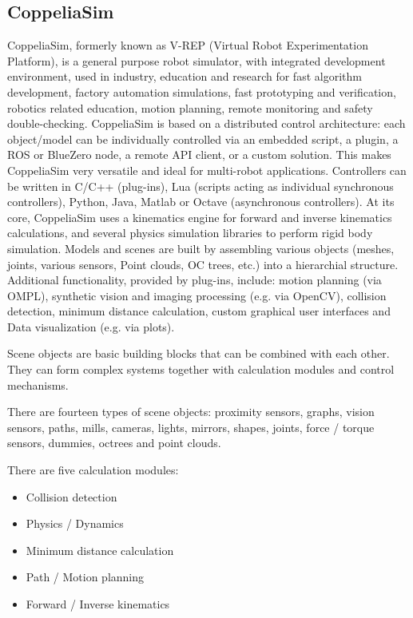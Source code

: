 \subsection{CoppeliaSim}
CoppeliaSim, formerly known as V-REP (Virtual Robot Experimentation Platform), is a general purpose robot simulator, with integrated development environment, used in industry, education and research for fast algorithm development, factory automation simulations, fast prototyping and verification, robotics related education, motion planning, remote monitoring and safety double-checking. 
CoppeliaSim is based on a distributed control architecture: each object/model can be individually controlled via an embedded script, a plugin, a ROS or BlueZero node, a remote API client, or a custom solution. This makes CoppeliaSim very versatile and ideal for multi-robot applications. Controllers can be written in C/C++ (plug-ins), Lua (scripts acting as individual synchronous controllers), Python, Java,  Matlab or Octave (asynchronous controllers). \cite{Robotsim90:online}
At its core, CoppeliaSim uses a kinematics engine for forward and inverse kinematics calculations, and several physics simulation libraries to perform rigid body simulation. Models and scenes are built by assembling various objects (meshes, joints, various sensors, Point clouds, OC trees, etc.) into a hierarchial structure. Additional functionality, provided by plug-ins, include: motion planning (via OMPL), synthetic vision and imaging processing (e.g. via OpenCV), collision detection, minimum distance calculation, custom graphical user interfaces and Data visualization (e.g. via plots). \cite{Coppelia94:online}


Scene objects are basic building blocks that can be combined with each other. They can form complex systems together with calculation modules and control mechanisms.

There are fourteen types of scene objects: proximity sensors, graphs, vision sensors, paths, mills, cameras, lights, mirrors, shapes, joints, force / torque sensors, dummies, octrees and point clouds.

There are five calculation modules:
\begin{itemize}
    \item Collision detection
    \item Physics / Dynamics
    \item Minimum distance calculation
    \item Path / Motion planning
    \item Forward / Inverse kinematics
\end{itemize}




 
